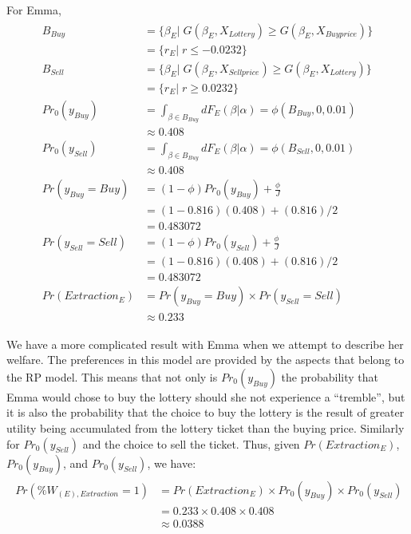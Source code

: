 \documentclass[11pt,a4paper]{article}
\newcommand\Prob{\ensuremath{\mathit{Pr}}}  %
\begin{document}
\noindent For Emma,
\begin{align}
	\label{eq:Emma}
	\begin{split}
		B_{\mathit{Buy}} &= \{ \beta_E |\; G(\beta_E,X_{\mathit{Lottery}}) \geq G(\beta_E,X_{\mathit{Buy price}})\}\\
		&= \{ r_E \big|\; r \leq -0.0232 \} \\
		B_{\mathit{Sell}} &= \{ \beta_E |\; G(\beta_E,X_{\mathit{Sell price}}) \geq G(\beta_E,X_{\mathit{Lottery}})\}\\
		&= \{ r_E \big|\; r \geq 0.0232 \} \\[0.5ex]
		{\Prob}_0(y_{\mathit{Buy}}) &= \int_{\beta \in B_{\mathit{Buy}}} dF_E(\beta|\alpha) = \phi(B_{\mathit{Buy}},0,0.01)\\[0.5ex]
		&\approx 0.408 \\
		{\Prob}_0(y_{\mathit{Sell}}) &= \int_{\beta \in B_{\mathit{Buy}}} dF_E(\beta|\alpha) = \phi(B_{\mathit{Sell}},0,0.01)\\[0.5ex]
		&\approx 0.408 \\
		{\Prob}(y_{\mathit{Buy}}=\mathit{Buy}) &= (1-\phi) {\Prob}_0(y_{\mathit{Buy}}) + \frac{\phi}{J}\\
		&=(1-0.816)(0.408) + (0.816)/2\\
		&= 0.483072\\
		{\Prob}(y_{\mathit{Sell}}=\mathit{Sell}) &= (1-\phi) {\Prob}_0(y_{\mathit{Sell}}) + \frac{\phi}{J}\\
		&=(1-0.816)(0.408) + (0.816)/2\\
		&= 0.483072\\
		{\Prob}(\mathit{Extraction}_E) &= {\Prob}(y_{\mathit{Buy}} = \mathit{Buy}) \times {\Prob}(y_{\mathit{Sell}} = \mathit{Sell})\\
		&\approx 0.233
	\end{split}
\end{align}

We have a more complicated result with Emma when we attempt to describe her welfare. 
The preferences in this model are provided by the aspects that belong to the RP model.
This means that not only is ${\Prob}_0(y_{\mathit{Buy}})$ the probability that Emma would chose to buy the lottery should she not experience a \enquote{tremble}, but it is also the probability that the choice to buy the lottery is the result of greater utility being accumulated from the lottery ticket than the buying price.
Similarly for ${\Prob}_0(y_{\mathit{Sell}})$ and the choice to sell the ticket.
Thus, given ${\Prob}(\mathit{Extraction}_E)$, ${\Prob}_0(y_{\mathit{Buy}})$, and ${\Prob}_0(y_{\mathit{Sell}})$, we have:
\begin{align}
	\begin{split}
		{\Prob}\left(\% W_{(E),\mathit{Extraction}} = 1\right) &= {\Prob}(\mathit{Extraction}_E) \times {\Prob}_0(y_{\mathit{Buy}}) \times {\Prob}_0(y_{\mathit{Sell}})\\
		&= 0.233 \times 0.408 \times 0.408\\
		&\approx 0.0388
	\end{split}
\end{align}
\end{document}
